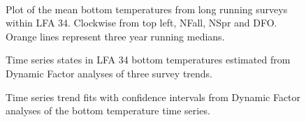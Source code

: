 \documentclass[11pt]{article}
\newcommand{\e}{/SpinDr/backup/bio_data/bio.lobster/figures/LFA3438Framework2019/} %
\begin{document}
    
\begin{figure}
        \centering
    \\
        
         \caption{Plot of the mean bottom temperatures from long running surveys within LFA 34. Clockwise from top left, NFall, NSpr and DFO.
         Orange lines represent three year running medians.}
        \end{figure}


   \begin{figure}
    \centering
        \caption{Time series states in LFA 34 bottom temperatures estimated from Dynamic Factor analyses of three survey trends.}

    \end{figure}

\begin{figure}
    \centering
        \caption{Time series trend fits with confidence intervals from Dynamic Factor analyses of the bottom temperature time series.}

    \end{figure}
\end{document}
